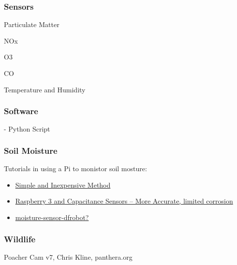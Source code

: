 \documentclass{article}\usepackage[]{graphicx}\usepackage[]{color}
\begin{document}
\subsubsection{Sensors}

Particulate Matter

NOx

O3

CO

Temperature and Humidity

\subsubsection{Software}

- Python Script

\subsubsection{Soil Moisture}


Tutorials in using a Pi to monistor soil mosture:

\begin{itemize}

\item \href{https://tutorials-raspberrypi.com/measuring-soil-moisture-with-raspberry-pi/}{Simple and Inexpensive Method}

\item \href{moisture-sensor-dfrobothttps://www.switchdoc.com/2018/11/tutorial-capacitive-moisture-sensor-grove/}{Raspberry 3 and Capacitance Sensors -- More Accurate, limited corrosion}

\item \href{https://tutorials-raspberrypi.com/raspberry-pi-capacitive-spoil-moisture-sensor-dfrobot-gravity/}{moisture-sensor-dfrobot?}
\end{itemize}

\subsubsection{Wildlife}

Poacher Cam v7, Chris Kline, panthera.org
\end{document}
